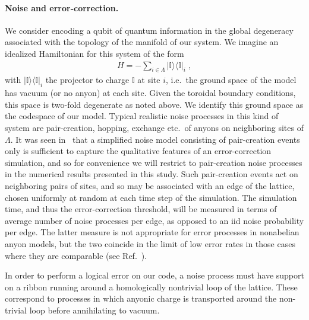 \documentclass[aps, prl, letterpaper, twocolumn, superscriptaddress, notitlepage, 10pt]{revtex4-1}
\newcommand{\ket}[1]{|{#1}\rangle}
\newcommand{\bra}[1]{\langle{#1}|}
\newcommand{\ketbra}[2]{\ket{#1}\!\bra{#2}}
\newcommand{\proj}[1]{\ketbra{#1}{#1}}
\begin{document}
\paragraph{Noise and error-correction.}

We consider encoding a qubit of quantum information in the global degeneracy associated 
with the topology of the manifold of our system. We imagine an idealized Hamiltonian for this 
system of the form
\begin{align}
	H=-\sum_{i\in \Lambda}\proj{\mathbb{I}}_i\;,\label{e:hamiltonian}
\end{align}
with $\proj{\mathbb{I}}_i$ the projector to charge $\mathbb{I}$ at site $i$, i.e.~the ground 
space of the model has vacuum (or no anyon) at each site. Given the toroidal boundary 
conditions, this space is two-fold degenerate as noted above. We identify this ground space 
as the codespace of our model. Typical realistic noise processes in this kind of system are 
pair-creation, hopping, exchange etc.~of anyons on neighboring sites of $\Lambda$. It was 
seen in~\cite{Brell2013} that a simplified noise model consisting of pair-creation events only 
is sufficient to capture the qualitative features of an error-correction simulation, and so for convenience we 
will restrict to pair-creation noise processes in the numerical results presented in this study. 
Such pair-creation events act on neighboring pairs of sites,
and so may be associated with an edge of the lattice, chosen 
uniformly at random at each time step of the simulation. The simulation time, and thus the 
error-correction threshold, will be measured in terms of average number of noise processes 
per edge, as opposed to an iid noise probability per edge. The latter measure is not 
appropriate for error processes in nonabelian anyon models, but the two coincide in the limit 
of low error rates in those cases where they are comparable (see Ref.~\cite{Brell2013}).

In order to perform a logical error on our code, a noise process must have support on a 
ribbon running around a homologically nontrivial loop of the lattice. These correspond to 
processes in which anyonic charge is transported around the non-trivial loop before 
annihilating to vacuum.
\end{document}
